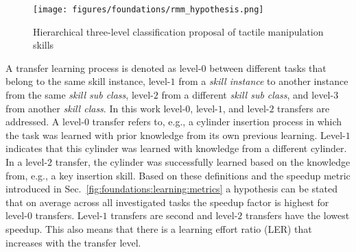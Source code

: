 \begin{figure*}[ht!]
    \centering
    \texttt{[image: figures/foundations/rmm\_hypothesis.png]}
    \caption{Hierarchical three-level classification proposal of tactile manipulation skills}
    \label{fig:foundations:learning:rmm_hypothesis}
\end{figure*}

A transfer learning process is denoted as level-$0$ between different tasks that belong to the same skill instance, level-$1$ from a \textit{skill instance} to another instance from the same \textit{skill sub class}, level-$2$ from a different \textit{skill sub class}, and level-$3$ from another \textit{skill class}.
In this work level-$0$, level-$1$, and level-$2$ transfers are addressed.
A level-$0$ transfer refers to, e.g., a cylinder insertion process in which the task was learned with prior knowledge from its own previous learning.
Level-$1$ indicates that this cylinder was learned with knowledge from a different cylinder.
In a level-$2$ transfer, the cylinder was successfully learned based on the knowledge from, e.g., a key insertion skill.
Based on these definitions and the speedup metric introduced in Sec.~\ref{fig:foundations:learning:metrics} a hypothesis can be stated that on average across all investigated tasks the speedup factor is highest for level-$0$ transfers.
Level-$1$ transfers are second and level-$2$ transfers have the lowest speedup.
This also means that there is a learning effort ratio (LER) that increases with the transfer level.